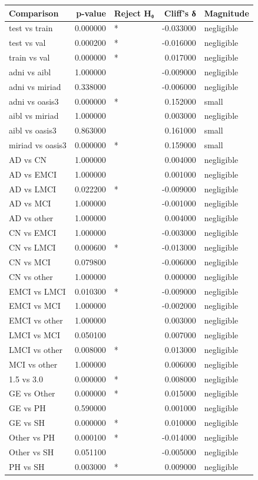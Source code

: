 \begin{tabular}{lrlrl}
\toprule
Comparison & p-value & Reject H₀ & Cliff’s δ & Magnitude \\
\midrule
test vs train & 0.000000 & * & -0.033000 & negligible \\
test vs val & 0.000200 & * & -0.016000 & negligible \\
train vs val & 0.000000 & * & 0.017000 & negligible \\
adni vs aibl & 1.000000 &  & -0.009000 & negligible \\
adni vs miriad & 0.338000 &  & -0.006000 & negligible \\
adni vs oasis3 & 0.000000 & * & 0.152000 & small \\
aibl vs miriad & 1.000000 &  & 0.003000 & negligible \\
aibl vs oasis3 & 0.863000 &  & 0.161000 & small \\
miriad vs oasis3 & 0.000000 & * & 0.159000 & small \\
AD vs CN & 1.000000 &  & 0.004000 & negligible \\
AD vs EMCI & 1.000000 &  & 0.001000 & negligible \\
AD vs LMCI & 0.022200 & * & -0.009000 & negligible \\
AD vs MCI & 1.000000 &  & -0.001000 & negligible \\
AD vs other & 1.000000 &  & 0.004000 & negligible \\
CN vs EMCI & 1.000000 &  & -0.003000 & negligible \\
CN vs LMCI & 0.000600 & * & -0.013000 & negligible \\
CN vs MCI & 0.079800 &  & -0.006000 & negligible \\
CN vs other & 1.000000 &  & 0.000000 & negligible \\
EMCI vs LMCI & 0.010300 & * & -0.009000 & negligible \\
EMCI vs MCI & 1.000000 &  & -0.002000 & negligible \\
EMCI vs other & 1.000000 &  & 0.003000 & negligible \\
LMCI vs MCI & 0.050100 &  & 0.007000 & negligible \\
LMCI vs other & 0.008000 & * & 0.013000 & negligible \\
MCI vs other & 1.000000 &  & 0.006000 & negligible \\
1.5 vs 3.0 & 0.000000 & * & 0.008000 & negligible \\
GE vs Other & 0.000000 & * & 0.015000 & negligible \\
GE vs PH & 0.590000 &  & 0.001000 & negligible \\
GE vs SH & 0.000000 & * & 0.010000 & negligible \\
Other vs PH & 0.000100 & * & -0.014000 & negligible \\
Other vs SH & 0.051100 &  & -0.005000 & negligible \\
PH vs SH & 0.003000 & * & 0.009000 & negligible \\
\bottomrule
\end{tabular}
